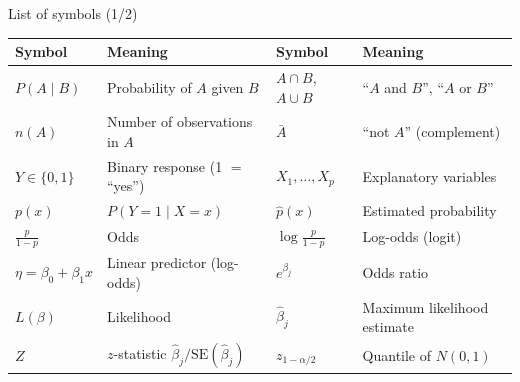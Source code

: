 \documentclass[aspectratio=169,11pt]{beamer}
\begin{document}
\begin{frame}{List of symbols (1/2)}
  \begin{center}
    \small
    \renewcommand{\arraystretch}{1.15}
    \begin{tabular}{@{}lp{4.5cm}lp{4.5cm}@{}}
      \toprule
      \textbf{Symbol} & \textbf{Meaning} & \textbf{Symbol} & \textbf{Meaning} \\
      \midrule
      $P(A\mid B)$ & Probability of $A$ given $B$ & $A\cap B$, $A\cup B$ & ``$A$ and $B$'', ``$A$ or $B$'' \\
      $n(A)$ & Number of observations in $A$ & $\bar A$ & ``not $A$'' (complement) \\
      $Y\in\{0,1\}$ & Binary response (1 $=$ ``yes'') & $X_1,\dots,X_p$ & Explanatory variables \\
      $p(x)$ & $P(Y=1\mid X=x)$ & $\hat p(x)$ & Estimated probability \\
      $\frac{p}{1-p}$ & Odds & $\log\frac{p}{1-p}$ & Log-odds (logit) \\
      $\eta=\beta_0+\beta_1x$ & Linear predictor (log-odds) & $e^{\beta_j}$ & Odds ratio \\
      $L(\beta)$ & Likelihood & $\hat\beta_j$ & Maximum likelihood estimate \\
      $Z$ & $z$-statistic $\hat\beta_j/\mathrm{SE}(\hat\beta_j)$ & $z_{1-\alpha/2}$ & Quantile of $N(0,1)$ \\
      \bottomrule
    \end{tabular}
  \end{center}
\end{frame}
\end{document}

